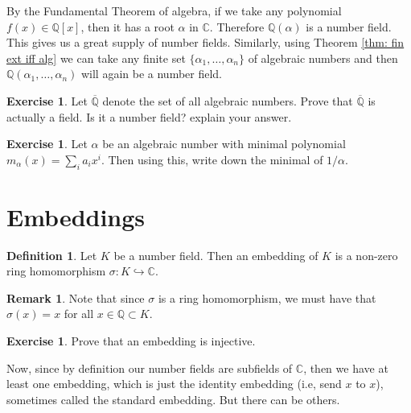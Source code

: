 \documentclass[11pt,a4paper]{report}
\theoremstyle{plain}
\theoremstyle{definition}
\newtheorem{defn}[subsection]{Definition}
\theoremstyle{definition}
\newtheorem{rmrk}[subsection]{Remark}
\newtheorem{question}[subsection]{Exercise}
\def\CC{\mathbb{C}}
\def\QQ{\mathbb{Q}}
\def \a{\alpha}
\def \s {\sigma}
\def \s {\sigma}
\def \ov{\overline}
\begin{document}
	By the Fundamental Theorem of algebra, if we take any polynomial $f(x) \in \QQ[x]$, then it has a root $\a$ in $\CC$. Therefore $\QQ(\a)$ is a number field. This gives us a great supply of number fields. Similarly, using Theorem \ref{thm: fin ext iff alg} we can take any finite set $\{\a_1,\dots,\a_n\}$ of algebraic numbers and then $\QQ(\a_1,\dots,\a_n)$ will again be a number field.
	
	
	\begin{question}
		Let $\ov{\QQ}$ denote the set of all algebraic numbers.	Prove that $\ov{\QQ}$ is actually a field. Is it a number field? explain your answer.
	\end{question}
	
	\begin{question}\label{ex: min pol of inv}
		Let $\a$ be an algebraic number with minimal polynomial $m_\a(x)=\sum_i a_i x^i$. Then using this, write down the minimal of $1/\a$.
	\end{question}
	
	\section{Embeddings}
	
	\begin{defn}
		Let $K$ be a number field. Then an embedding of $K$ is a non-zero ring homomorphism $\s:K \hookrightarrow \CC$.
	\end{defn}
	
	\begin{rmrk}
		Note that since $\s$ is a ring homomorphism, we must have that $\s(x)=x$ for all $x \in \QQ \subset K$.
	\end{rmrk}
	
	\begin{question}
		Prove that an embedding is injective.
	\end{question}
	
	Now, since by definition our number fields are subfields of $\CC$, then we have at least one embedding, which  is just the identity embedding (i.e, send $x$ to $x$), sometimes called the standard embedding. But there can be others.
	
\end{document}
